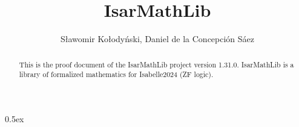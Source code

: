 \documentclass[11pt,a4paper]{article}
\begin{document}
\title{IsarMathLib}
\author{S\l awomir Ko\l ody\'{n}ski, Daniel de la Concepci\'{o}n S\'{a}ez}
\maketitle

\begin{abstract}
This is the proof document of the IsarMathLib project version 1.31.0. 
IsarMathLib is a library of formalized mathematics for Isabelle2024 (ZF logic). 
 
\end{abstract}

\tableofcontents

\parindent 0pt\parskip 0.5ex





\end{document}

